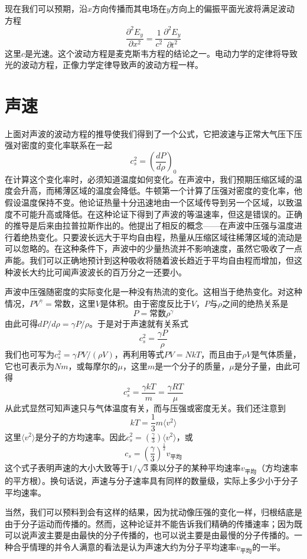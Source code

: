 现在我们可以预期，沿$x$方向传播而其电场在$y$方向上的偏振平面光波将满足波动方程
\begin{equation}
    \label{Eq:I:47:20}
    \frac{\partial^2E_y}{\partial x^2} = \frac{1}{c^2}\frac{\partial^2E_y}{\partial t^2}
\end{equation}
这里$c$是光速。这个波动方程是麦克斯韦方程的结论之一。电动力学的定律将导致光的波动方程，正像力学定律导致声的波动方程一样。

\section{声速}

上面对声波的波动方程的推导使我们得到了一个公式，它把波速与正常大气压下压强对密度的变化率联系在一起
\begin{equation}
    \label{Eq:I:47:21}
    c_s^2 = \left(\frac{dP}{d\rho}\right)_0
\end{equation}
在计算这个变化率时，必须知道温度如何变化。在声波中，我们预期压缩区域的温度会升高，而稀薄区域的温度会降低。牛顿第一个计算了压强对密度的变化率，他假设温度保持不变。他论证热量十分迅速地由一个区域传导到另一个区域，以致温度不可能升高或降低。在这种论证下得到了声波的等温速率，但这是错误的。正确的推导是后来由拉普拉斯作出的。他提出了相反的概念——在声波中压强与温度进行着绝热变化。只要波长远大于平均自由程，热量从压缩区域往稀薄区域的流动是可以忽略的。在这种条件下，声波中的少量热流并不影响速度，虽然它吸收了一点声能。我们可以正确地预计到这种吸收将随着波长趋近于平均自由程而增加，但这种波长大约比可闻声波波长的百万分之一还要小。

声波中压强随密度的实际变化是一种没有热流的变化。这相当于绝热变化。对这种情况，$PV^{\gamma}=\text{常数}$，这里$V$是体积。由于密度反比于$V$，$P$与$\rho$之间的绝热关系是
\begin{equation}
    \label{Eq:I:47:22}
    P=\text{常数}\rho^\gamma
\end{equation}
由此可得$dP /d\rho = \gamma P /\rho$。于是对于声速就有关系式
\begin{equation}
    \label{Eq:I:47:23}
    c_s^2 = \frac{\gamma P}{\rho}
\end{equation}
我们也可写为$c_s^2 = \gamma PV/(\rho V)$，再利用等式$PV=NkT$，而且由于$\rho V$是气体质量，它也可表示为$Nm$，或每摩尔的$\mu$，这里$m$是一个分子的质量，$\mu$是分子量，由此可得
\begin{equation}
    \label{Eq:I:47:24}
    c_s^2 = \frac{\gamma kT}{m} = \frac{\gamma RT}{\mu}
\end{equation}
从此式显然可知声速只与气体温度有关，而与压强或密度无关。我们还注意到
\begin{equation}
    \label{Eq:I:47:25}
    kT = \frac{1}{3}m\langle v^2 \rangle
\end{equation}
这里$\langle v^2 \rangle$是分子的方均速率。因此$c_s^2=\left(\frac{\gamma}{3}\right)\langle v^2 \rangle$，或
\begin{equation}
    \label{Eq:I:47:26}
    c_s = \left(\frac{\gamma}{3}\right)^{\frac{1}{2}} v_\text{平均}
\end{equation}
这个式子表明声速的大小大致等于$1/\sqrt{3}$乘以分子的某种平均速率$v_\text{平均}$（方均速率的平方根）。换句话说，声速与分子速率具有同样的数量级，实际上多少小于分子平均速率。

当然，我们可以预料到会有这样的结果，因为扰动像压强的变化一样，归根结底是由于分子运动而传播的。然而，这种论证并不能告诉我们精确的传播速率；因为既可以说声波主要是由最快的分子传播的，也可以说主要是由最慢的分子传播的。一种合乎情理的并令人满意的看法是认为声速大约为分子平均速率$v_\text{平均}$的一半。